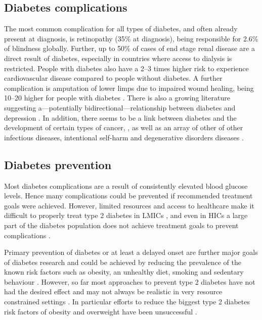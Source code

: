 \subsection{Diabetes complications}

The most common complication for all types of diabetes, and often already present at diagnosis, is retinopathy (35\% at diagnosis), being responsible for 2.6\% of blindness globally. Further, up to 50\% of cases of end stage renal disease are a direct result of diabetes, especially in countries where access to dialysis is restricted. People with diabetes also have a 2--3 times higher risk to experience cardiovascular disease compared to people without diabetes. A further complication is amputation of lower limps due to impaired wound healing, being 10--20 higher for people with diabetes \parencite{WorldHealthOrganization2016}. There is also a growing literature suggesting a---potentially bidirectional---relationship between diabetes and depression \parencite{VanDooren2013,Nouwen2010,Roy2012}. In addition, there seems to be a link between diabetes and the development of certain types of cancer, \parencite{Tsilidis2015,Nead2015}, as well as an array of other of other infectious diseases, intentional self-harm and degenerative disorders diseases \parencite{Seshasai2011}.


\subsection{Diabetes prevention}

Most diabetes complications are a result of consistently elevated blood glucose levels. Hence many complications could be prevented if recommended treatment goals were achieved. However, limited resources and access to healthcare make it difficult to properly treat type 2 diabetes in \acp{LMIC} \parencite{Villalpando2010}, and even in \acp{HIC} a large part of the diabetes population does not achieve treatment goals to prevent complications \parencite{DiabetesUK2012}. 

Primary prevention of diabetes or at least a delayed onset are further major goals of diabetes research and could be achieved by reducing the prevalence of the known risk factors such as obesity, an unhealthy diet, smoking and sedentary behaviour \parencite{WorldHealthOrganization2016}. However, so far most approaches to prevent type 2 diabetes have not had the desired effect and may not always be realistic in very resource constrained settings \parencite{White2016}. In particular efforts to reduce the biggest type 2 diabetes risk factors of obesity and overweight have been unsuccessful \parencite{Roberto2015}.

